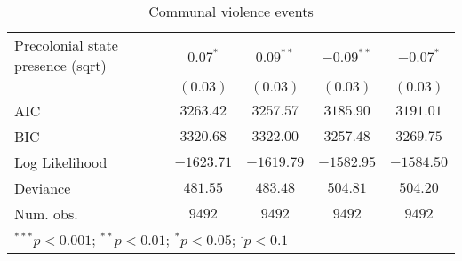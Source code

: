 \begin{sidewaystable}
\begin{center}
{\begin{tabular}{l c c c c}
Precolonial state presence (sqrt)     & $0.07^{*}$   & $0.09^{**}$   & $-0.09^{**}$ & $-0.07^{*}$  \\
                                      & $(0.03)$     & $(0.03)$      & $(0.03)$     & $(0.03)$     \\
\midrule
AIC                                   & $3263.42$    & $3257.57$     & $3185.90$    & $3191.01$    \\
BIC                                   & $3320.68$    & $3322.00$     & $3257.48$    & $3269.75$    \\
Log Likelihood                        & $-1623.71$   & $-1619.79$    & $-1582.95$   & $-1584.50$   \\
Deviance                              & $481.55$     & $483.48$      & $504.81$     & $504.20$     \\
Num. obs.                             & $9492$       & $9492$        & $9492$       & $9492$       \\
\bottomrule
\multicolumn{5}{l}{\scriptsize{$^{***}p<0.001$; $^{**}p<0.01$; $^{*}p<0.05$; $^{\cdot}p<0.1$}}
\end{tabular}
}
\caption{Communal violence events}
\label{org3}
\end{center}
\end{sidewaystable}
